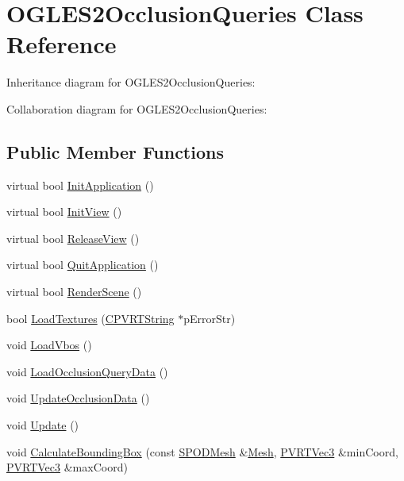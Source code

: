 \hypertarget{class_o_g_l_e_s2_occlusion_queries}{\section{O\+G\+L\+E\+S2\+Occlusion\+Queries Class Reference}
\label{class_o_g_l_e_s2_occlusion_queries}
}


Inheritance diagram for O\+G\+L\+E\+S2\+Occlusion\+Queries\+:


Collaboration diagram for O\+G\+L\+E\+S2\+Occlusion\+Queries\+:
\subsection*{Public Member Functions}
\begin{DoxyCompactItemize}
\item 
virtual bool \hyperlink{class_o_g_l_e_s2_occlusion_queries_ac242a2023c6aa02925bfce301db4d420}{Init\+Application} ()
\item 
virtual bool \hyperlink{class_o_g_l_e_s2_occlusion_queries_a886c285f3cba8d44b4d8d13e6ee4873d}{Init\+View} ()
\item 
virtual bool \hyperlink{class_o_g_l_e_s2_occlusion_queries_a15a46c9465394c09b807d8ffe886b91d}{Release\+View} ()
\item 
virtual bool \hyperlink{class_o_g_l_e_s2_occlusion_queries_a607fb3d751d3c3e8cfb9b65cbdaf1292}{Quit\+Application} ()
\item 
virtual bool \hyperlink{class_o_g_l_e_s2_occlusion_queries_abf4f321ccdc3cac3e81ee2124d2e1999}{Render\+Scene} ()
\item 
bool \hyperlink{class_o_g_l_e_s2_occlusion_queries_adb8892fd76d90da64291cef73f45ab13}{Load\+Textures} (\hyperlink{class_c_p_v_r_t_string}{C\+P\+V\+R\+T\+String} $\ast$p\+Error\+Str)
\item 
void \hyperlink{class_o_g_l_e_s2_occlusion_queries_a40331da65de0a0643069c7982dbe29ab}{Load\+Vbos} ()
\item 
void \hyperlink{class_o_g_l_e_s2_occlusion_queries_a894c65d44b2a3cefa5942ee69d6e055c}{Load\+Occlusion\+Query\+Data} ()
\item 
void \hyperlink{class_o_g_l_e_s2_occlusion_queries_a96be63a5ed92f586c5d0dbc260a7900f}{Update\+Occlusion\+Data} ()
\item 
void \hyperlink{class_o_g_l_e_s2_occlusion_queries_a723cf4c71acaf04ce0cfcb184c1b6dd9}{Update} ()
\item 
void \hyperlink{class_o_g_l_e_s2_occlusion_queries_a21a27436b5331cc6df532d610b69517f}{Calculate\+Bounding\+Box} (const \hyperlink{struct_s_p_o_d_mesh}{S\+P\+O\+D\+Mesh} \&\hyperlink{class_mesh}{Mesh}, \hyperlink{struct_p_v_r_t_vec3}{P\+V\+R\+T\+Vec3} \&min\+Coord, \hyperlink{struct_p_v_r_t_vec3}{P\+V\+R\+T\+Vec3} \&max\+Coord)

\end{DoxyCompactItemize}
